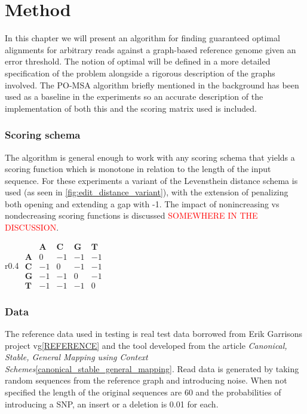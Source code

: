 \documentclass[thesis.tex]{subfiles}
\begin{document}
\chapter{Method}
In this chapter we will present an algorithm for finding guaranteed optimal alignments for arbitrary reads against a graph-based reference genome given an error threshold. The notion of optimal will be defined in a more detailed specification of the problem alongside a rigorous description of the graphs involved. The PO-MSA algorithm briefly mentioned in the background has been used as a baseline in the experiments so an accurate description of the implementation of both this and the scoring matrix used is included.
\subsection{Scoring schema}
The algorithm is general enough to work with any scoring schema that yields a scoring function which is monotone in relation to the length of the input sequence. For these experiments a variant of the Levensthein distance schema is used (as seen in \ref{fig:edit_distance_variant}), with the extension of penalizing both opening and extending a gap with -1. The impact of nonincreasing vs nondecreasing scoring functions is discussed \textcolor{red}{SOMEWHERE IN THE DISCUSSION}.
\begin{wrapfigure}{r}{0.4\textwidth}
	$
	\begin{array}{r|rrrr}
	 & \mathbf{A} & \mathbf{C} & \mathbf{G} & \mathbf{T} \\ \hline
	\mathbf{A} & 0 & -1 & -1 & -1 \\
	\mathbf{C} & -1 & 0 & -1 & -1 \\
	\mathbf{G} & -1 & -1 & 0 & -1 \\
	\mathbf{T} & -1 & -1 & -1 & 0
	\end{array}
	$
	\label{fig:edit_distance_variant}
	\caption{The scoring matrix used in the experiments}
\end{wrapfigure}
\subsection{Data}
The reference data used in testing is real test data borrowed from Erik Garrisons project vg\ref{REFERENCE} and the tool developed from the article \textit{Canonical, Stable, General Mapping using Context Schemes}\ref{canonical_stable_general_mapping}. Read data is generated by taking random sequences from the reference graph and introducing noise. When not specified the length of the original sequences are 60 and the probabilities of introducing a SNP, an insert or a deletion is 0.01 for each.
\end{document}
